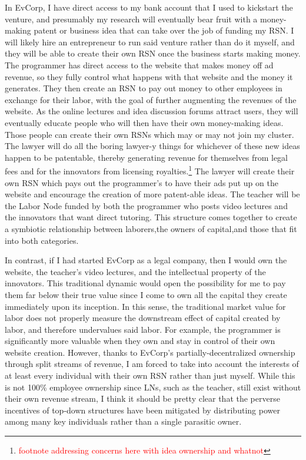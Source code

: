 \documentclass{article}[10pt]
\begin{document}
In EvCorp, I have direct access to my bank account that I used to kickstart the venture, and presumably my research will eventually bear fruit with a money-making patent or business idea that can take over the job of funding my RSN.
I will likely hire an entrepreneur to run said venture rather than do it myself, and they will be able to create their own RSN once the business starts making money.
The programmer has direct access to the website that makes money off ad revenue, so they fully control what happens with that website and the money it generates.
They then create an RSN to pay out money to other employees in exchange for their labor, with the goal of further augmenting the revenues of the website.
As the online lectures and idea discussion forums attract users, they will eventually educate people who will then have their own money-making ideas.
Those people can create their own RSNs which may or may not join my cluster.
The lawyer will do all the boring lawyer-y things for whichever of these new ideas happen to be patentable, thereby generating revenue for themselves from legal fees and for the innovators from licensing royalties.\footnote{
    \textcolor{red}{footnote addressing concerns here with idea ownership and whatnot}}
The lawyer will create their own RSN which pays out the programmer's to have their ads put up on the website and encourage the creation of more patent-able ideas.
The teacher will be the Labor Node funded by both the programmer who posts video lectures and the innovators that want direct tutoring.
This structure comes together to create a symbiotic relationship between laborers,\footnotemark the owners of capital,\footnotemark and those that fit into both categories.\footnotemark \par
{}

In contrast, if I had started EvCorp as a legal company, then I would own the website, the teacher's video lectures, and the intellectual property of the innovators.
This traditional dynamic would open the possibility for me to pay them far below their true value since I come to own all the capital they create immediately upon its inception.
In this sense, the traditional market value for labor does not properly measure the downstream effect of capital created by labor, and therefore undervalues said labor.
For example, the programmer is significantly more valuable when they own and stay in control of their own website creation.
However, thanks to EvCorp's partially-decentralized ownership through split streams of revenue, I am forced to take into account the interests of at least every individual with their own RSN rather than just myself.
While this is not 100\% employee ownership since LNs, such as the teacher, still exist without their own revenue stream, I think it should be pretty clear that the perverse incentives of top-down structures have been mitigated by distributing power among many key individuals rather than a single parasitic owner. 
\end{document}
